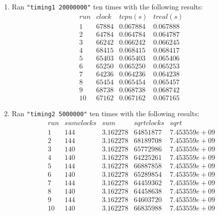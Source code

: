 \documentclass[12pt,fleqn,leqno,letterpaper]{article}
\begin{document}
\begin{enumerate}
    \item Ran \texttt{"timing1 20000000"} ten times with the following
        results:\\
        $$
        \begin{array}{lccc}
            run & clock & t cpu (s) & t real (s) \\
            1 & 67884 & 0.067884 & 0.067888 \\
            2 & 64784 & 0.064784 & 0.064787 \\
            3 & 66242 & 0.066242 & 0.066245 \\
            4 & 68415 & 0.068415 & 0.068417 \\
            5 & 65403 & 0.065403 & 0.065406 \\
            6 & 65250 & 0.065250 & 0.065253 \\
            7 & 64236 & 0.064236 & 0.064238 \\
            8 & 65454 & 0.065454 & 0.065457 \\
            9 & 68738 & 0.068738 & 0.068742 \\
            10 & 67162 & 0.067162 & 0.067165
        \end{array}
        $$

    \item Ran \texttt{"timing2 5000000"} ten times with the following
        results:\\
        $$
        \begin{array}{lcccc}
            run & sum clocks & sum & sqrt clocks & sqrt \\
            1 & 144 & 3.162278 & 64851877 & 7.453559e+09 \\
            2 & 144 & 3.162278 & 68189708 & 7.453559e+09 \\
            3 & 140 & 3.162278 & 65772986 & 7.453559e+09 \\
            4 & 140 & 3.162278 & 64225261 & 7.453559e+09 \\
            5 & 144 & 3.162278 & 66887858 & 7.453559e+09 \\
            6 & 140 & 3.162278 & 65289854 & 7.453559e+09 \\
            7 & 144 & 3.162278 & 64459362 & 7.453559e+09 \\
            8 & 140 & 3.162278 & 64458638 & 7.453559e+09 \\
            9 & 144 & 3.162278 & 64603720 & 7.453559e+09 \\
            10 & 140 & 3.162278 & 66835988 & 7.453559e+09
        \end{array}
        $$


\end{enumerate}
\end{document}
